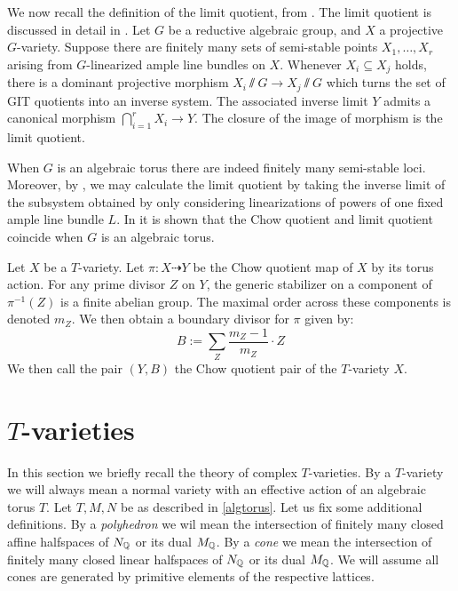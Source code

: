 We now recall the definition of the limit quotient, from \cite{mumford1994}. The limit quotient is discussed in detail in \cite{baker2012}. Let \(G\) be a reductive algebraic group, and \(X\) a projective \(G\)-variety. Suppose there are finitely many sets of semi-stable points \(X_1,\dots,X_r\) arising from \(G\)-linearized ample line bundles on \(X\).  Whenever \(X_i \subseteq X_j\) holds, there is a dominant projective morphism \(X_i \sslash G \to X_j \sslash G\) which turns the set of GIT quotients into an inverse system. The associated inverse limit \(Y\) admits a canonical morphism \(\bigcap_{i=1}^r X_i \to Y\). The closure of the image of morphism is the limit quotient.

When \(G\) is an algebraic torus there are indeed finitely many semi-stable loci. Moreover, by \cite[Corollary 2.7]{baker2012}, we may calculate the limit quotient by taking the inverse limit of the subsystem obtained by only considering linearizations of powers of one fixed ample line bundle \(L\).
%
%
%
In \cite[Proposition 2.5]{baker2012} it is shown that the Chow quotient and limit quotient coincide when \(G\) is an algebraic torus.

Let \(X\) be a \(T\)-variety. Let \(\pi:X \dashrightarrow Y\) be the Chow quotient map of \(X\) by its torus action. For any prime divisor \(Z\) on \(Y\), the generic stabilizer on a component of \(\pi^{-1}(Z)\) is a finite abelian group. The maximal order across these components is denoted \(m_Z\). We then obtain a boundary divisor for \(\pi\) given by:
\begin{equation} \label{boundary}
B := \sum_Z \frac{m_Z-1}{m_Z} \cdot Z
\end{equation}
We then call the pair \((Y,B)\) the Chow quotient pair of the \(T\)-variety \(X\).
\section{$T$-varieties} \label{prelim:Tvar}
In this section we briefly recall the theory of complex \(T\)-varieties. By a \(T\)-variety we will always mean a normal variety with an effective action of an algebraic torus \(T\). Let \(T,M,N\) be as described in \ref{algtorus}. Let us fix some additional definitions. By a \textit{polyhedron} we wil mean the intersection of finitely many closed affine halfspaces of \(N_{\mathbb{Q}}\) or its dual \(M_{\mathbb{Q}}\). By a \textit{cone} we mean the intersection of finitely many closed linear halfspaces of \(N_{\mathbb{Q}}\) or its dual \(M_{\mathbb{Q}}\). We will assume all cones are generated by primitive elements of the respective lattices.
